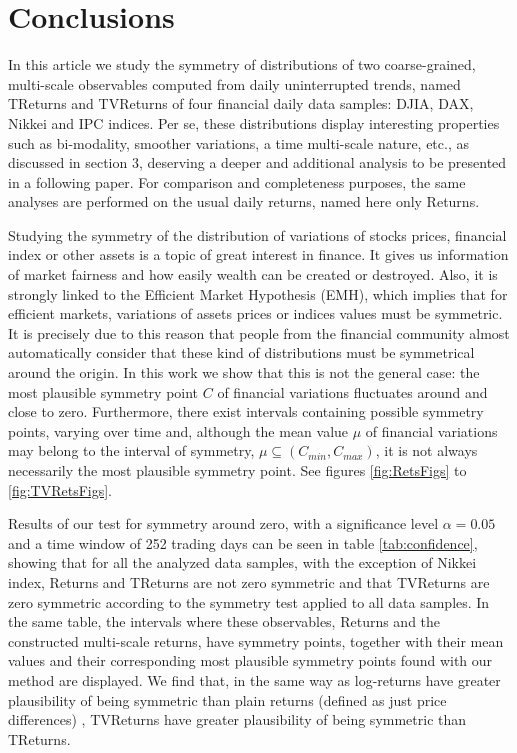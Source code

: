 \documentclass{elsarticle}
\begin{document}

\section{Conclusions}
\label{sec:Final}


 In this article  we study the symmetry of distributions of two coarse-grained,  multi-scale observables  computed from daily uninterrupted trends, named TReturns and TVReturns of four financial 
daily data samples: DJIA, DAX, Nikkei and IPC indices. Per se, these distributions display
interesting properties such as bi-modality, smoother variations,
a time multi-scale nature, etc., as discussed in section 3, deserving a deeper
and additional analysis to be presented in a following paper. For comparison
and completeness purposes, the same analyses are performed on the usual daily
returns, named here only Returns.

Studying the symmetry of the distribution of variations of stocks prices, financial
index or other assets is a topic of great interest in finance. It gives us information of market fairness and how easily wealth can be created or destroyed. Also,
it is strongly linked to the Efficient Market Hypothesis (EMH), which implies
that for efficient markets, variations of assets prices or indices values must be
symmetric. It is precisely due to this reason that people from the financial
community almost automatically consider that these kind of distributions must
be symmetrical around the origin. In this work we show that this is not the general case: the most plausible symmetry point $C$ of financial variations fluctuates
around and close to zero. Furthermore, there exist intervals containing possible
symmetry points, varying over time and, although the mean value $\mu$ of financial
variations may belong to the interval of symmetry, $\mu \subseteq (C_{min},C_{max})$, it is not always necessarily the most plausible symmetry point. See figures \ref{fig:RetsFigs} to \ref{fig:TVRetsFigs}.

Results of our test for symmetry around zero, with a  significance level $\alpha=0.05$ 
and a time window of 252 trading days can be seen in table \ref{tab:confidence}, showing that
for all the analyzed data samples, with the exception of Nikkei index, Returns
and TReturns are not zero symmetric and that TVReturns are zero symmetric
according to the symmetry test applied to all data samples. In the same table, 
the intervals where these observables, Returns and the constructed multi-scale returns,
have symmetry points, together with their mean values and their corresponding most 
plausible symmetry points found with our method are displayed. We find that, in the same way as log-returns have greater plausibility of being symmetric than plain returns (defined as just price differences) \cite{Beedles}, TVReturns have greater plausibility of being symmetric than TReturns.
\end{document}
